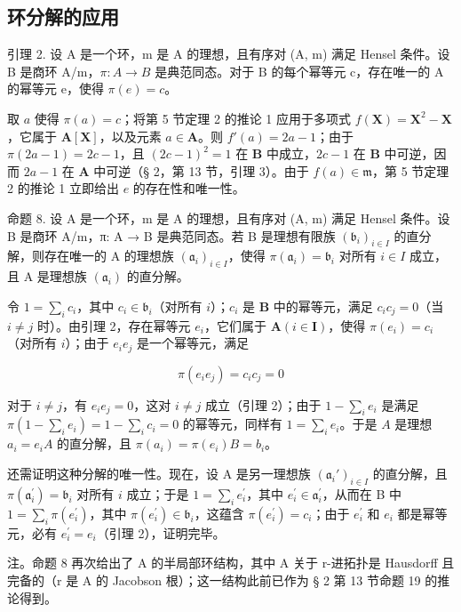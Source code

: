 \subsection{环分解的应用}

引理 2. 设 A 是一个环，m 是 A 的理想，且有序对 (A, m) 满足 Hensel 条件。设 B 是商环 A/m，\(\pi: A \to B\) 是典范同态。对于 B 的每个幂等元 c，存在唯一的 A 的幂等元 e，使得 \(\pi(e) = c\)。

取 \(a\) 使得 \(\pi(a) = c\)；将第 5 节定理 2 的推论 1 应用于多项式 \(f(\mathbf{X}) = \mathbf{X}^2 - \mathbf{X}\)，它属于 \(\mathbf{A}[\mathbf{X}]\)，以及元素 \(a \in \mathbf{A}\)。则 \(f'(a) = 2a - 1\)；由于 \(\pi(2a - 1) = 2c - 1\)，且 \((2c - 1)^2 = 1\) 在 \(\mathbf{B}\) 中成立，\(2c - 1\) 在 \(\mathbf{B}\) 中可逆，因而 \(2a - 1\) 在 \(\mathbf{A}\) 中可逆（§ 2，第 13 节，引理 3）。由于 \(f(a) \in \mathfrak{m}\)，第 5 节定理 2 的推论 1 立即给出 \(e\) 的存在性和唯一性。

命题 8. 设 A 是一个环，m 是 A 的理想，且有序对 (A, m) 满足 Hensel 条件。设 B 是商环 A/m，π: A → B 是典范同态。若 B 是理想有限族 \((\mathfrak{b}_{i})_{i\in I}\) 的直分解，则存在唯一的 A 的理想族 \((\mathfrak{a}_{i})_{i\in I}\)，使得 \(\pi(\mathfrak{a}_{i}) = \mathfrak{b}_{i}\) 对所有 \(i \in I\) 成立，且 A 是理想族 \((\mathfrak{a}_{i})\) 的直分解。

令 \(1 = \sum_{i} c_{i}\)，其中 \(c_{i} \in \mathfrak{b}_{i}\)（对所有 \(i\)）；\(c_{i}\) 是 \(\mathbf{B}\) 中的幂等元，满足 \(c_{i}c_{j} = 0\)（当 \(i \neq j\) 时）。由引理 2，存在幂等元 \(e_{i}\)，它们属于 \(\mathbf{A} (i \in \mathbf{I})\)，使得 \(\pi(e_{i}) = c_{i}\)（对所有 \(i\)）；由于 \(e_{i}e_{j}\) 是一个幂等元，满足

\[
\pi (e _ {i} e _ {j}) = c _ {i} c _ {j} = 0
\]

对于 \(i \neq j\)，有 \(e_i e_j = 0\)，这对 \(i \neq j\) 成立（引理 2）；由于 \(1 - \sum_{i} e_i\) 是满足 \(\pi\left(1 - \sum_{i} e_i\right) = 1 - \sum_{i} c_i = 0\) 的幂等元，同样有 \(1 = \sum_{i} e_i\)。于是 \(A\) 是理想 \(a_i = e_i A\) 的直分解，且 \(\pi(a_i) = \pi(e_i) B = b_i\)。

还需证明这种分解的唯一性。现在，设 A 是另一理想族 \((\mathfrak{a}_i')_{i\in I}\) 的直分解，且 \(\pi (\mathfrak{a}_i^{\prime}) = \mathfrak{b}_i\) 对所有 \(i\) 成立；于是 \(1 = \sum_{i}e_{i}^{\prime}\)，其中 \(e_i^\prime \in \mathfrak{a}_i^\prime\)，从而在 B 中 \(1 = \sum_{i}\pi (e_i^{\prime})\)，其中 \(\pi (e_i^{\prime})\in \mathfrak{b}_i\)，这蕴含 \(\pi (e_i^{\prime}) = c_i\)；由于 \(e_i^\prime\) 和 \(e_i\) 都是幂等元，必有 \(e_i^\prime = e_i\)（引理 2），证明完毕。

注。命题 8 再次给出了 A 的半局部环结构，其中 A 关于 r-进拓扑是 Hausdorff 且完备的（r 是 A 的 Jacobson 根）；这一结构此前已作为 § 2 第 13 节命题 19 的推论得到。

